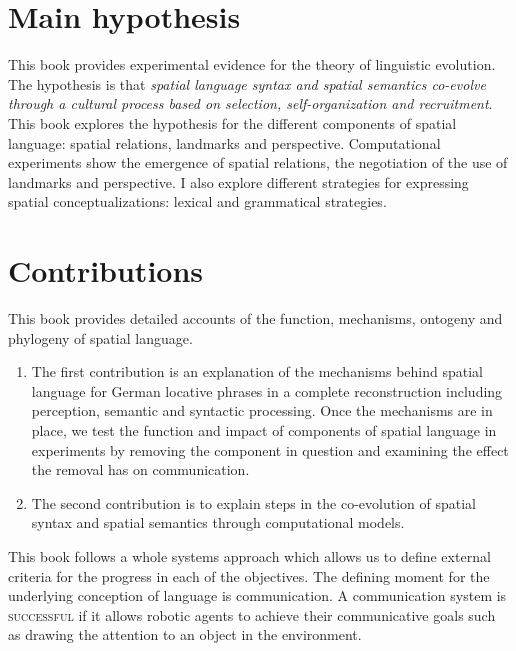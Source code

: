 \section{Main hypothesis}
\label{s:intro-main-hypothesis}
This book provides experimental evidence for the theory of linguistic
evolution. The hypothesis is that \emph{spatial language syntax and 
spatial semantics co-evolve through a cultural process based on selection, 
self-organization and recruitment}. This book explores the hypothesis for 
the different components of spatial language: spatial relations, landmarks 
and perspective. Computational experiments
show the emergence of spatial relations, the negotiation of the use of landmarks
and perspective. I also explore different strategies for expressing
spatial conceptualizations: lexical and grammatical strategies.

\section{Contributions}
\label{s:intro-objectives}
This book provides detailed accounts of 
the function, mechanisms, ontogeny and phylogeny of spatial language. 
\begin{enumerate}
\item The first contribution is an explanation of the mechanisms behind spatial language
for German locative phrases in a complete reconstruction including
perception, semantic and syntactic processing. Once the mechanisms are in place,
we test the function and impact of components of spatial language in experiments
by removing the component in question and examining the effect the removal has
on communication.
\item The second contribution is to explain steps in the co-evolution of spatial 
syntax and spatial semantics through computational models.
\end{enumerate}

This book follows a whole systems approach which allows us to define external 
criteria for the progress in each of the objectives. The defining moment for the 
underlying conception of language is communication. A communication system 
is \textsc{successful} if it allows robotic agents to achieve 
their communicative goals such as drawing the attention to an object in the environment. 

